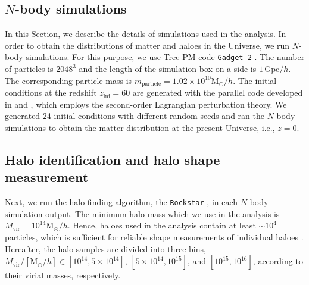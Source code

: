 \documentclass[a4paper,fleqn,usenatbib]{mnras}
\newcommand{\vir}{\mathrm{vir}}
\newcommand{\Msun}{\mathrm{M}_\odot}
\begin{document}
\subsection{$N$-body simulations}
In this Section, we describe the details of simulations used in the analysis.
In order to obtain the distributions of matter and haloes in the Universe,
we run $N$-body simulations.
For this purpose, we use Tree-PM code {\tt Gadget-2} \citep{Springel2005}.
The number of particles is $2048^3$ and the length of the simulation box
on a side is $1\,\mathrm{Gpc}/h$. The corresponding particle mass
is $m_\mathrm{particle} = 1.02 \times 10^{10} \Msun/h$.
The initial conditions at the redshift $z_\mathrm{ini} = 60$ are generated with
the parallel code developed in \citet{Nishimichi2009,Nishimichi2010}
and \citet{Valageas2011},
which employs the second-order Lagrangian perturbation theory.
We generated 24 initial conditions with different random seeds
and ran the $N$-body simulations to obtain the matter distribution
at the present Universe, i.e., $z=0$.

\subsection{Halo identification and halo shape measurement}

Next, we run the halo finding algorithm,
the {\tt Rockstar} \citep{Behroozi2013}, in each $N$-body simulation output.
The minimum halo mass which we use in the
analysis is $M_\vir = 10^{14} \Msun/h$. Hence, haloes used in the
analysis contain at least $\sim 10^4$ particles, which is sufficient
for reliable shape measurements of individual haloes \citep{Jing2002}.
Hereafter, the halo samples are divided into three bins,
$M_\vir/[\Msun /h] \in [10^{14}, 5 \times 10^{14}]$,
$[5 \times 10^{14}, 10^{15}]$, and $[10^{15}, 10^{16}]$,
according to their virial masses, respectively.
\end{document}
